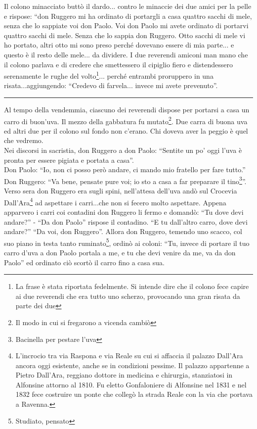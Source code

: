 \documentclass[10pt]{memoir} %
\begin{document}
Il colono minacciato buttò il dardo... contro le minaccie dei due amici per la pelle e rispose: “don Ruggero mi ha ordinato di portargli a casa quattro sacchi di mele, senza che lo sappiate voi don Paolo. Voi don Paolo mi avete ordinato di portarvi quattro sacchi di mele. Senza che lo sappia don Ruggero. Otto sacchi di mele vi ho portato, altri otto mi sono preso perché dovevano essere di mia parte... e questo è il resto delle mele... da dividere. 
I due reverendi amiconi man mano che il colono parlava e di credere che smettessero il cipiglio fiero e distendessero serenamente le rughe del volto\footnote{La frase è stata riportata fedelmente. Si intende dire che il colono fece capire ai due reverendi che era tutto uno scherzo, provocando una gran risata da parte dei due}... perché entrambi proruppero in una risata...aggiungendo: “Credevo di farvela... invece mi avete prevenuto”.
\begin{center}
\rule{1.5cm}{0.4pt}
\end{center}
Al tempo della vendemmia, ciascuno dei reverendi dispose per portarsi a casa un carro di buon’uva. Il mezzo della gabbatura fu mutato\footnote{Il modo in cui si fregarono a vicenda cambiò}. Due carra di buona uva ed altri due per il colono sul fondo non c’erano. Chi doveva aver la peggio è quel che vedremo. \\
Nei discorsi in sacristia, don Ruggero a don Paolo: “Sentite un po' oggi l’uva è pronta per essere pigiata e portata a casa”.\\
Don Paolo: “Io, non ci posso però andare, ci mando mio fratello per fare tutto.”\\
Don Ruggero: “Va bene, pensate pure voi; io sto a casa a far preparare il tino\footnote{Bacinella per pestare l'uva}”.\\
Verso sera don Ruggero era sugli spini, nell’attesa dell’uva andò sul Crocevia Dall’Ara\footnote{L'incrocio tra via Raspona e via Reale su cui si affaccia il palazzo Dall'Ara ancora oggi esistente, anche se in condizioni pessime. Il palazzo appartenne a Pietro Dall'Ara, reggiano dottore in medicina e chirurgia, stanziatosi in Alfonsine attorno al 1810. Fu eletto Gonfaloniere di Alfonsine nel 1831 e nel 1832 fece costruire un ponte che collegò la strada Reale con la via che portava a Ravenna.} ad aspettare i carri...che non si fecero molto aspettare. Appena apparvero i carri coi contadini don Ruggero li fermo e domandò: “Tu dove devi andare?” - “Da don Paolo” rispose il contadino. “E tu dall’altro carro, dove devi andare?” “Da voi, don Ruggero”. Allora don Ruggero, temendo uno scacco, col suo piano in testa tanto ruminato\footnote{Studiato, pensato}, ordinò ai coloni: “Tu, invece di portare il tuo carro d’uva a don Paolo portala a me, e tu che devi venire da me, va da don Paolo” ed ordinato ciò scortò il carro fino a casa sua.\\
\end{document}
